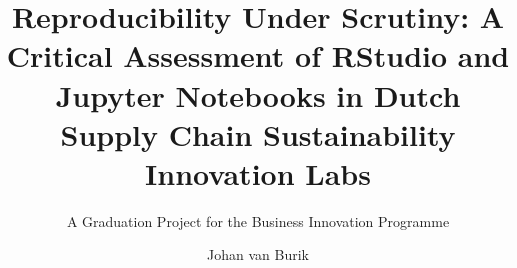 \documentclass[
  oneside,
  open=any]{scrbook}
\title{Reproducibility Under Scrutiny: A Critical Assessment of RStudio
and Jupyter Notebooks in Dutch Supply Chain Sustainability Innovation
Labs}
\subtitle{A Graduation Project for the Business Innovation Programme}
\author{Johan van Burik}
\date{}
\begin{document}

  \begin{frontmatter}

\begin{titlepage}


\newcommand{\titlepagepagealign}{
\ifthenelse{\equal{left}{right}}{\raggedleft}{}
\ifthenelse{\equal{left}{center}}{\centering}{}
\ifthenelse{\equal{left}{left}}{\raggedright}{}
}


\newcommand{\titleandsubtitle}{
{{\large{\bfseries{\nohyphens{Reproducibility Under Scrutiny: A Critical
Assessment of RStudio and Jupyter Notebooks in Dutch Supply Chain
Sustainability Innovation Labs}}}}\par
}%

\vspace{\betweentitlesubtitle}
{
{\large{\textit{\nohyphens{A Graduation Project for the Business
Innovation Programme}}}}\par
}}
\newcommand{\titlepagetitleblock}{
\titleandsubtitle
}

\newcommand{\authorstyle}[1]{{\large{#1}}}

\newcommand{\affiliationstyle}[1]{{\large{#1}}}

\newcommand{\titlepageauthorblock}{
{\authorstyle{\nohyphens{Johan van
Burik}{\textsuperscript{1}}\textsuperscript{,}{\textsuperscript{2}}}}}

\newcommand{\titlepageaffiliationblock}{
\hangindent=1em
\hangafter=1
{\affiliationstyle{
{1}.~Inholland University of Applied Sciences,~Business Innovation
Programme,~Amsterdam, Netherlands
\par\hangindent=1em\hangafter=1{2}.~Windesheim University of Applied
Sciences,~Value Chain Hackers Lab,~Zwolle, Netherlands


\vspace{1\baselineskip} 
}}
}
\newcommand{\headerstyled}{%
{Inholland University of Applied Sciences}
}
\newcommand{\footerstyled}{%
{\large{Business Innovation Programme\\
Graduation Project 2024-2025\\
Supervisor: {[}Supervisor Name{]}\\}}
}
\newcommand{\datestyled}{%
{}
}


\newcommand{\titlepageheaderblock}{\headerstyled}

\newcommand{\titlepagefooterblock}{
\footerstyled
}


\end{titlepage}
\end{frontmatter}
\end{document}
